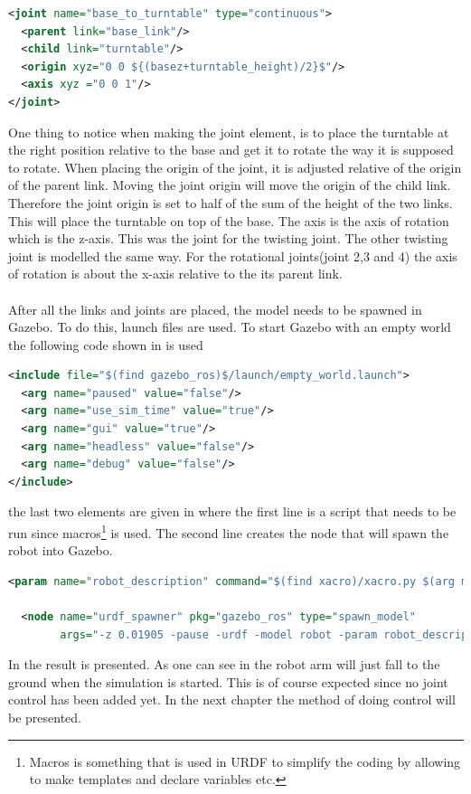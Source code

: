 \begin{lstlisting}[language=xml,caption={joint between base and turntable},label={lst:jointBTT}]
<joint name="base_to_turntable" type="continuous">
  <parent link="base_link"/>
  <child link="turntable"/>
  <origin xyz="0 0 ${(basez+turntable_height)/2}$"/>
  <axis xyz ="0 0 1"/>
</joint>
\end{lstlisting}
One thing to notice when making the joint element, is to place the turntable at the right position relative to the base and get it to rotate the way it is supposed to rotate. When placing the origin of the joint, it is adjusted relative of the origin of the parent link. Moving the joint origin will move the origin of the child link. Therefore the joint origin is set to half of the sum of the height of the two links. This will place the turntable on top of the base. The axis is the axis of rotation which is the z-axis. This was the joint for the twisting joint. The other twisting joint is modelled the same way. For the rotational joints(joint 2,3 and 4) the axis of rotation is about the x-axis relative to the its parent link. \\\\
After all the links and joints are placed, the model needs to be spawned in Gazebo. To do this, launch files are used. To start Gazebo with an empty world the following code shown in  is used
\begin{lstlisting}[language=xml,caption={Start Gazebo with empty world},label={lst:empty}]
<include file="$(find gazebo_ros)$/launch/empty_world.launch">
  <arg name="paused" value="false"/>
  <arg name="use_sim_time" value="true"/>
  <arg name="gui" value="true"/>
  <arg name="headless" value="false"/>
  <arg name="debug" value="false"/>
</include>
\end{lstlisting}
the last two elements are given in  where the first line is a script that needs to be run since macros\footnote{Macros is something that is used in URDF to simplify the coding by allowing to make templates and declare variables etc.} is used. The second line creates the node that will spawn the robot into Gazebo. 
\begin{lstlisting}[caption={Spawn robot model in Gazebo},label={lst:l2},language=xml]
  <param name="robot_description" command="$(find xacro)/xacro.py $(arg model)" />

  <node name="urdf_spawner" pkg="gazebo_ros" type="spawn_model"
        args="-z 0.01905 -pause -urdf -model robot -param robot_description" respawn="false" output="screen" />
\end{lstlisting}
In  the result is presented. As one can see in  the robot arm will just fall to the ground when the simulation is started. This is of course expected since no joint control has been added yet. In the next chapter the method of doing control will be presented. 

